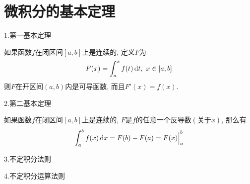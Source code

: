 \chapter{微积分的基本定理}
1.第一基本定理
\begin{theorem}[微积分的第一基本定理:]
如果函数$f$在闭区间$[a,b]$上是连续的, 定义$F$为
\[F(x)=\int_a^xf(t)\dif t,\ x\in[a,b]\]
则$F$在开区间$(a,b)$内是可导函数, 而且$F'(x)=f(x)$.
\end{theorem}\vspace{4ex}

2.第二基本定理
\begin{theorem}[微积分的第二基本定理:]
如果函数$f$在闭区间$[a,b]$上是连续的, $F$是$f$的任意一个反导数$(\text{关于}x)$, 那么有
\[\int_a^bf(x)\mathop{}\!\mathrm{d} x=F(b)-F(a)=F(x)\Big|_a^b\]
\end{theorem}\vspace{4ex}

3.不定积分法则
{\par\centering
{}
\par}\vspace{4ex}

4.不定积分运算法则
{\par\centering
{}\\[2ex]
\par}\vspace{4ex}

